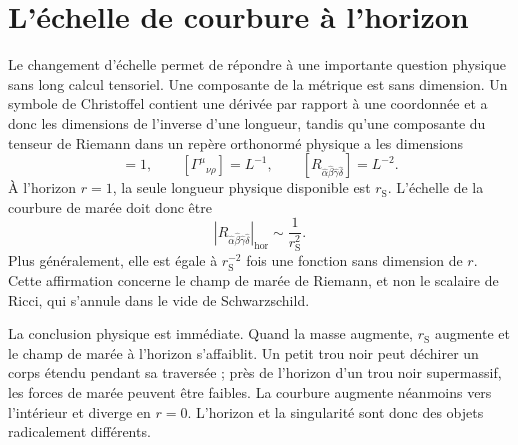 \begin{classroomqa}
\end{classroomqa}

\section{L’échelle de courbure à l’horizon}

Le changement d’échelle permet de répondre à une importante question physique sans long calcul tensoriel. Une composante de la métrique est sans dimension. Un symbole de Christoffel contient une dérivée par rapport à une coordonnée et a donc les dimensions de l’inverse d’une longueur, tandis qu’une composante du tenseur de Riemann dans un repère orthonormé physique a les dimensions
\begin{equation}
[g_{\mu\nu}]=1,
\qquad
[\Gamma^\mu{}_{\nu\rho}]=L^{-1},
\qquad
[R_{\hat\alpha\hat\beta\hat\gamma\hat\delta}]
=L^{-2}.
\label{eq:l7-curvature-dimensions}
\end{equation}
À l’horizon \(r=1\), la seule longueur physique disponible est \(r_{\mathrm S}\). L’échelle de la courbure de marée doit donc être
\begin{equation}
\left|R_{\hat\alpha\hat\beta\hat\gamma\hat\delta}\right|_{\mathrm{hor}}
\sim \frac{1}{r_{\mathrm S}^2}.
\label{eq:l7-horizon-curvature}
\end{equation}
Plus généralement, elle est égale à \(r_{\mathrm S}^{-2}\) fois une fonction sans dimension de \(r\). Cette affirmation concerne le champ de marée de Riemann, et non le scalaire de Ricci, qui s’annule dans le vide de Schwarzschild.

La conclusion physique est immédiate. Quand la masse augmente, \(r_{\mathrm S}\) augmente et le champ de marée à l’horizon s’affaiblit. Un petit trou noir peut déchirer un corps étendu pendant sa traversée ; près de l’horizon d’un trou noir supermassif, les forces de marée peuvent être faibles. La courbure augmente néanmoins vers l’intérieur et diverge en \(r=0\). L’horizon et la singularité sont donc des objets radicalement différents.

